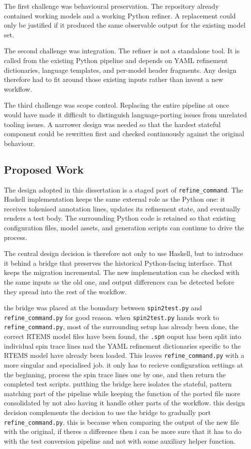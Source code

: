 The first challenge was behavioural preservation. The repository already contained working models and a working Python refiner. A replacement could only be justified if it produced the same observable output for the existing model set.

The second challenge was integration. The refiner is not a standalone tool. It is called from the existing Python pipeline and depends on YAML refinement dictionaries, language templates, and per-model header fragments. Any design therefore had to fit around those existing inputs rather than invent a new workflow.

The third challenge was scope control. Replacing the entire pipeline at once would have made it difficult to distinguish language-porting issues from unrelated tooling issues. A narrower design was needed so that the hardest stateful component could be rewritten first and checked continuously against the original behaviour.

\subsection{Proposed Work}

The design adopted in this dissertation is a staged port of \texttt{refine\_command}. The Haskell implementation keeps the same external role as the Python one: it receives tokenised annotation lines, updates its refinement state, and eventually renders a test body. The surrounding Python code is retained so that existing configuration files, model assets, and generation scripts can continue to drive the process.

The central design decision is therefore not only to use Haskell, but to introduce it behind a bridge that preserves the historical Python-facing interface. That keeps the migration incremental. The new implementation can be checked with the same inputs as the old one, and output differences can be detected before they spread into the rest of the workflow.

the bridge was placed at the boundary between \texttt{spin2test.py} and \texttt{refine\_command.py} for good reason. when \texttt{spin2test.py} hands work to \texttt{refine\_command.py}, most of the surrounding setup has already been done, the correct RTEMS model files have been found, the \texttt{.spn} ouput has been split into individual spin trace lines nad the YAML refinement dictionaries specific to the RTEMS model have already been loaded. This leaves \texttt{refine\_command.py} with a more singular and specialised job. it only has to recieve configuration settings at the beginning, process the spin trace lines one by one, and then return the completed test scripts. putthing the bridge here isolates the stateful, pattern matching part of the pipeline while keeping the function of the ported file more consolidated by not also having it handle other parts of the workflow.
this design decision complements the decision to use the bridge to gradually port \texttt{refine\_command.py}. this is because when comparing the output of the new file with the original, if theres a difference then i can be more sure that it has to do with the test conversion pipeline and not with some auxiliary helper function.

